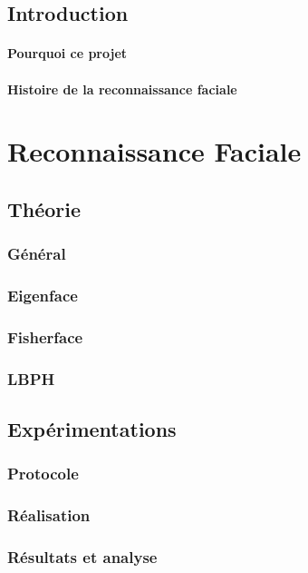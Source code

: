 \documentclass{report}
\begin{document}
\renewcommand{\chaptername}{Partie}
	\begin{abstract}
	\end{abstract}
	\chapter*{Introduction}
		\subsection{Pourquoi ce projet}
		\subsection{Histoire de la reconnaissance faciale}
	\part{Reconnaissance Faciale}
		\chapter{Th\'eorie}
			\section{G\'en\'eral}
			\section{Eigenface}
			\section{Fisherface}
			\section{LBPH}
		\chapter{Exp\'erimentations}
			\section{Protocole}
			\section{R\'ealisation}
			\section{R\'esultats et analyse}
\end{document}
